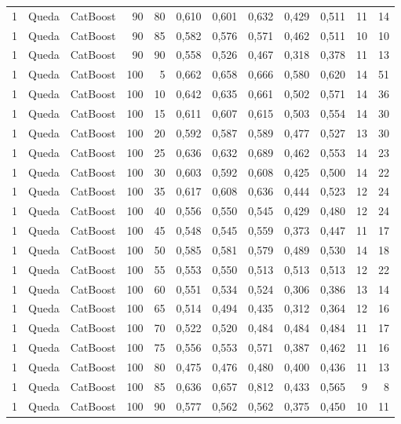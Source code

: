 \begin{longtable}{@{}rllrrrrrrrrr@{}}
1 & Queda & CatBoost & 90 & 80 & 0,610 & 0,601 & 0,632 & 0,429 & 0,511 & 11 & 14 \\
1 & Queda & CatBoost & 90 & 85 & 0,582 & 0,576 & 0,571 & 0,462 & 0,511 & 10 & 10 \\
1 & Queda & CatBoost & 90 & 90 & 0,558 & 0,526 & 0,467 & 0,318 & 0,378 & 11 & 13 \\
1 & Queda & CatBoost & 100 & 5 & 0,662 & 0,658 & 0,666 & 0,580 & 0,620 & 14 & 51 \\
1 & Queda & CatBoost & 100 & 10 & 0,642 & 0,635 & 0,661 & 0,502 & 0,571 & 14 & 36 \\
1 & Queda & CatBoost & 100 & 15 & 0,611 & 0,607 & 0,615 & 0,503 & 0,554 & 14 & 30 \\
1 & Queda & CatBoost & 100 & 20 & 0,592 & 0,587 & 0,589 & 0,477 & 0,527 & 13 & 30 \\
1 & Queda & CatBoost & 100 & 25 & 0,636 & 0,632 & 0,689 & 0,462 & 0,553 & 14 & 23 \\
1 & Queda & CatBoost & 100 & 30 & 0,603 & 0,592 & 0,608 & 0,425 & 0,500 & 14 & 22 \\
1 & Queda & CatBoost & 100 & 35 & 0,617 & 0,608 & 0,636 & 0,444 & 0,523 & 12 & 24 \\
1 & Queda & CatBoost & 100 & 40 & 0,556 & 0,550 & 0,545 & 0,429 & 0,480 & 12 & 24 \\
1 & Queda & CatBoost & 100 & 45 & 0,548 & 0,545 & 0,559 & 0,373 & 0,447 & 11 & 17 \\
1 & Queda & CatBoost & 100 & 50 & 0,585 & 0,581 & 0,579 & 0,489 & 0,530 & 14 & 18 \\
1 & Queda & CatBoost & 100 & 55 & 0,553 & 0,550 & 0,513 & 0,513 & 0,513 & 12 & 22 \\
1 & Queda & CatBoost & 100 & 60 & 0,551 & 0,534 & 0,524 & 0,306 & 0,386 & 13 & 14 \\
1 & Queda & CatBoost & 100 & 65 & 0,514 & 0,494 & 0,435 & 0,312 & 0,364 & 12 & 16 \\
1 & Queda & CatBoost & 100 & 70 & 0,522 & 0,520 & 0,484 & 0,484 & 0,484 & 11 & 17 \\
1 & Queda & CatBoost & 100 & 75 & 0,556 & 0,553 & 0,571 & 0,387 & 0,462 & 11 & 16 \\
1 & Queda & CatBoost & 100 & 80 & 0,475 & 0,476 & 0,480 & 0,400 & 0,436 & 11 & 13 \\
1 & Queda & CatBoost & 100 & 85 & 0,636 & 0,657 & 0,812 & 0,433 & 0,565 & 9 & 8 \\
1 & Queda & CatBoost & 100 & 90 & 0,577 & 0,562 & 0,562 & 0,375 & 0,450 & 10 & 11 \\

\end{longtable}

